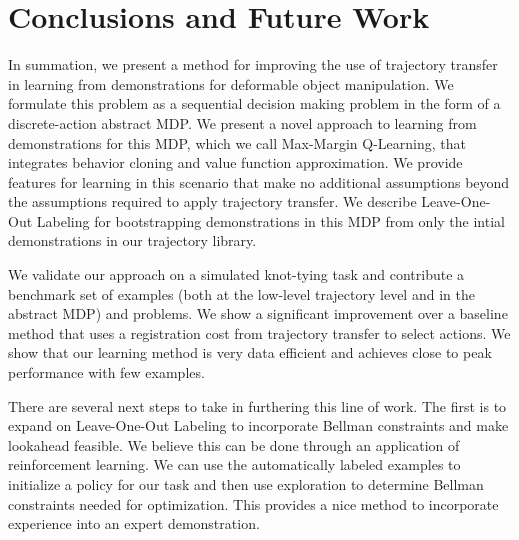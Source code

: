 \section{Conclusions and Future Work}
In summation, we present a method for improving the use of trajectory transfer in 
learning from demonstrations for deformable object manipulation. 
We formulate this problem as a sequential decision making
problem in the form of a discrete-action abstract MDP. We present a novel approach to 
learning from demonstrations for this MDP, which we call Max-Margin Q-Learning, that 
integrates behavior cloning and value function approximation. We provide
features for learning in this scenario that make no additional assumptions beyond
the assumptions required to apply trajectory transfer. We describe Leave-One-Out Labeling 
for bootstrapping demonstrations in this MDP from only the intial demonstrations in our
trajectory library.

We validate our approach on a simulated knot-tying task and contribute a benchmark
set of examples (both at the low-level trajectory level and in the abstract MDP) and 
problems. We show a significant improvement over a baseline method that uses
a registration cost from trajectory transfer to select actions. We show that our learning
method is very data efficient and achieves close to peak performance with few examples.

There are several next steps to take in furthering this line of work. The first is to
expand on Leave-One-Out Labeling to incorporate Bellman constraints and make lookahead 
feasible. We believe this can be done through an application of reinforcement learning.
We can use the automatically labeled examples to initialize a policy for our task and then
use exploration to determine Bellman constraints needed for optimization. This provides
a nice method to incorporate experience into an expert demonstration.
